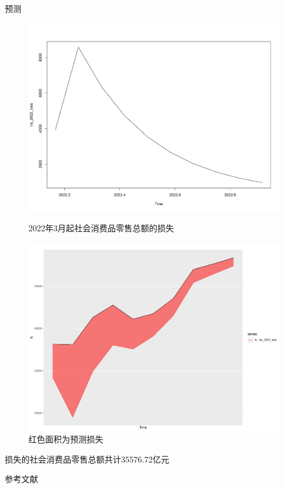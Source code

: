 \documentclass[10pt]{beamer}
\begin{document}
\begin{frame}{预测}
  \begin{figure}[H] %
    \centering %
    \begin{minipage}[t]{0.48\textwidth}
      \centering
      \includegraphics[width=1\textwidth]{figures/loss_2022.pdf} %
      \caption{2022年3月起社会消费品零售总额的损失} %
      \label{loss_2022} %
    \end{minipage}
    \begin{minipage}[t]{0.48\textwidth}
      \centering %
      \includegraphics[width=1\textwidth]{figures/compare_2022.pdf} %
      \caption{红色面积为预测损失} %
      \label{compare_2022} %
    \end{minipage}
  \end{figure} 
  损失的社会消费品零售总额共计35576.72亿元\nocite{stl}\nocite{yang2022estimating}\nocite{Rob}\nocite{Ruey}\nocite{yandou}
\end{frame}


\begin{frame}{参考文献}
  
  
\end{frame}


{\1
\begin{frame}
\end{frame}}
\end{document}

